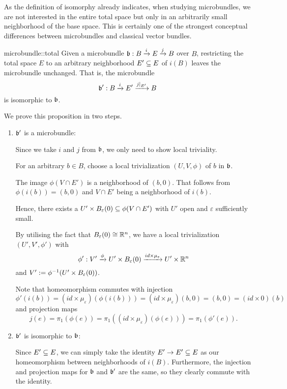 \begin{myparagraph}
    As the definition of isomorphy already indicates, when studying microbundles,
    we are not interested in the entire total space
    but only in an arbitrarily small neighborhood of the base space.
    This is certainly one of the strongest conceptual differences between microbundles and classical vector bundles.
\end{myparagraph}

\begin{myproposition}{microbundle::total}
    Given a microbundle $\bundledef{\bb}{B}{E}{i}{j}$ over $B$,
    restricting the total space $E$ to an arbitrary neighborhood $E' \sub E$ of $i(B)$ leaves the microbundle unchanged.
    That is, the microbundle
    \[ \bundledef{\bb'}{B}{E'}{i}{j\restr{E'}} \]
    is isomorphic to $\bb$.
\end{myproposition}

\begin{myproof}
    We prove this proposition in two steps.
    \begin{enumerate}
        \item $\bb'$ is a microbundle:
        
        Since we take $i$ and $j$ from $\bb$, we only need to show local triviality.

        For an arbitrary $b \in B$, choose a local trivialization $(U, V, \phi)$ of $b$ in $\bb$.
        
        The image $\phi(V \cap E')$ is a neighborhood of $(b, 0)$.
        That follows from $\phi(i(b)) = (b, 0)$ and $V \cap E'$ being a neighborhood of $i(b)$.

        Hence, there exists a $U' \times \ball[\varepsilon] \sub \phi(V \cap E')$ with $U'$ open and $\varepsilon$ sufficiently small.

        By utilising the fact that $\ball[\varepsilon] \cong \R^n$, we have a local trivialization $(U', V', \phi')$ with
        \[ \phi': V' \xto{\phi} U' \times \ball[\varepsilon] \xto{id \times \mu_\varepsilon} U' \times \R^n \]
        and $V' := \phi^{-1}(U' \times \ball[\varepsilon])$.

        Note that homeomorphism commutes with injection
        \[ \phi'(i(b)) =  (id \times \mu_\varepsilon)(\phi(i(b))) = (id \times \mu_\varepsilon)(b, 0) = (b, 0) = (id \times 0)(b)\]
        and projection maps
        \[ j(e) = \pi_1(\phi(e)) = \pi_1((id \times \mu_\varepsilon)(\phi(e))) = \pi_1(\phi'(e)). \]
        
        \item $\bb'$ is isomorphic to $\bb$:

        Since $E' \sub E$, we can simply take the identity $E' \to E' \sub E$ as our homeomorphism between neighborhoods of $i(B)$.
        Furthermore, the injection and projection maps for $\bb$ and $\bb'$ are the same, so they clearly commute with the identity.
    \end{enumerate}
\end{myproof}